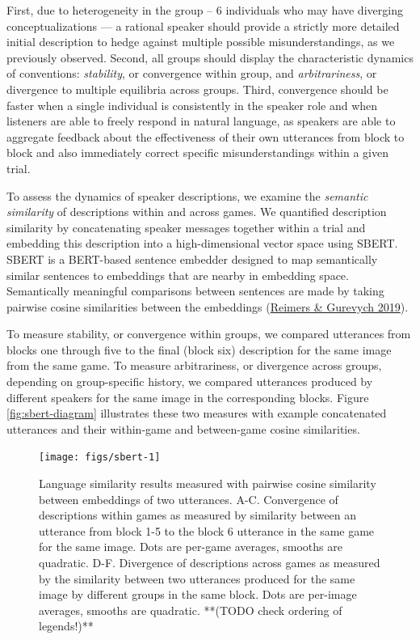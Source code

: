\documentclass[
  english,
]{article}
\begin{document}
First, due to heterogeneity in the group -- 6 individuals who may have diverging conceptualizations --- a rational speaker should provide a strictly more detailed initial description to hedge against multiple possible misunderstandings, as we previously observed.
Second, all groups should display the characteristic dynamics of conventions: \emph{stability}, or convergence within group, and \emph{arbitrariness}, or divergence to multiple equilibria across groups.
Third, convergence should be faster when a single individual is consistently in the speaker role and when listeners are able to freely respond in natural language, as speakers are able to aggregate feedback about the effectiveness of their own utterances from block to block and also immediately correct specific misunderstandings within a given trial.

To assess the dynamics of speaker descriptions, we examine the \emph{semantic similarity} of descriptions within and across games.
We quantified description similarity by concatenating speaker messages together within a trial and embedding this description into a high-dimensional vector space using SBERT.
SBERT is a BERT-based sentence embedder designed to map semantically similar sentences to embeddings that are nearby in embedding space.
Semantically meaningful comparisons between sentences are made by taking pairwise cosine similarities between the embeddings (\protect\hyperlink{ref-reimers2019}{Reimers \& Gurevych 2019}).

To measure stability, or convergence within groups, we compared utterances from blocks one through five to the final (block six) description for the same image from the same game.
To measure arbitrariness, or divergence across groups, depending on group-specific history, we compared utterances produced by different speakers for the same image in the corresponding blocks.
Figure \ref{fig:sbert-diagram} illustrates these two measures with example concatenated utterances and their within-game and between-game cosine similarities.

\begin{figure}[t!]

{\centering \texttt{[image: figs/sbert-1]} 

}

\caption{Language similarity results measured with pairwise cosine similarity between embeddings of two utterances. A-C. Convergence of descriptions within games as measured by similarity between an utterance from block 1-5 to the block 6 utterance in the same game for the same image. Dots are per-game averages, smooths are quadratic. D-F. Divergence of descriptions across games as measured by the similarity between two utterances produced for the same image by different groups in the same block. Dots are per-image averages, smooths are quadratic. **(TODO check ordering of legends!)**}\label{fig:sbert}
\end{figure}
\end{document}
